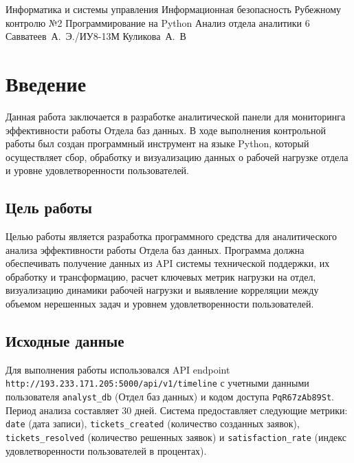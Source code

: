 \documentclass{bmstu}
\begin{document}



\makereporttitle
    {Информатика и системы управления} %
    {Информационная безопасность} %
    {Рубежному контролю №2} %
    {Программирование на Python} %
    {Анализ отдела аналитики} %
    {6} %
    {Савватеев~А.~Э./ИУ8-13М} %
    {Куликова~А.~В} %

\maketableofcontents
\newpage

\chapter*{Введение}

Данная работа заключается в разработке аналитической панели для мониторинга эффективности работы Отдела баз данных. В ходе выполнения контрольной работы был создан программный инструмент на языке Python, который осуществляет сбор, обработку и визуализацию данных о рабочей нагрузке отдела и уровне удовлетворенности пользователей.

\section*{Цель работы}

Целью работы является разработка программного средства для аналитического анализа эффективности работы Отдела баз данных. Программа должна обеспечивать получение данных из API системы технической поддержки, их обработку и трансформацию, расчет ключевых метрик нагрузки на отдел, визуализацию динамики рабочей нагрузки и выявление корреляции между объемом нерешенных задач и уровнем удовлетворенности пользователей.

\section*{Исходные данные}

Для выполнения работы использовался API endpoint \texttt{http://193.233.171.205:5000/api/v1/timeline} с учетными данными пользователя \texttt{analyst\_db} (Отдел баз данных) и кодом доступа \texttt{PqR67zAb89St}. Период анализа составляет 30 дней. Система предоставляет следующие метрики: \texttt{date} (дата записи), \texttt{tickets\_created} (количество созданных заявок), \texttt{tickets\_resolved} (количество решенных заявок) и \texttt{satisfaction\_rate} (индекс удовлетворенности пользователей в процентах).
\end{document}
